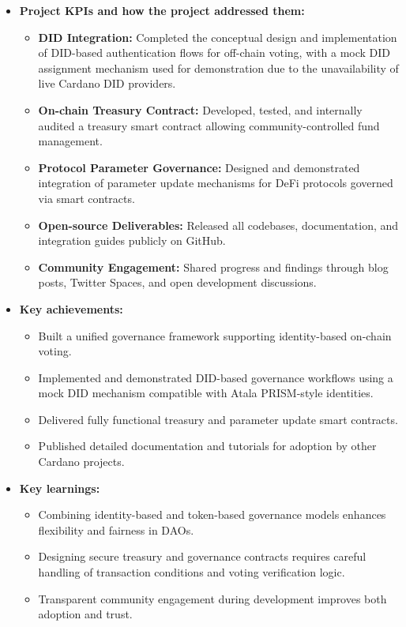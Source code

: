 \documentclass[11pt]{article}
\begin{document}
\begin{itemize}[leftmargin=1cm]
    \item \textbf{Project KPIs and how the project addressed them:}
    \begin{itemize}
        \item \textbf{DID Integration:} Completed the conceptual design and implementation of DID-based authentication flows for off-chain voting, with a mock DID assignment mechanism used for demonstration due to the unavailability of live Cardano DID providers.
        \item \textbf{On-chain Treasury Contract:} Developed, tested, and internally audited a treasury smart contract allowing community-controlled fund management.
        \item \textbf{Protocol Parameter Governance:} Designed and demonstrated integration of parameter update mechanisms for DeFi protocols governed via smart contracts.
        \item \textbf{Open-source Deliverables:} Released all codebases, documentation, and integration guides publicly on GitHub.
        \item \textbf{Community Engagement:} Shared progress and findings through blog posts, Twitter Spaces, and open development discussions.
    \end{itemize}

    \item \textbf{Key achievements:}
    \begin{itemize}
        \item Built a unified governance framework supporting identity-based on-chain voting.
        \item Implemented and demonstrated DID-based governance workflows using a mock DID mechanism compatible with Atala PRISM-style identities.
        \item Delivered fully functional treasury and parameter update smart contracts.
        \item Published detailed documentation and tutorials for adoption by other Cardano projects.
    \end{itemize}

    \item \textbf{Key learnings:}
    \begin{itemize}
        \item Combining identity-based and token-based governance models enhances flexibility and fairness in DAOs.
        \item Designing secure treasury and governance contracts requires careful handling of transaction conditions and voting verification logic.
        \item Transparent community engagement during development improves both adoption and trust.
    \end{itemize}


\end{itemize}
\end{document}
